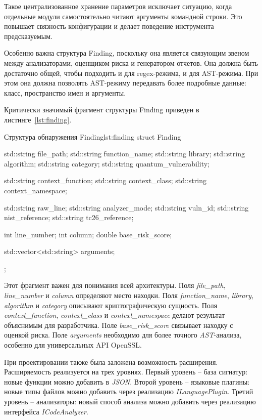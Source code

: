\documentclass{itmo-vkr}
\begin{document}
	Такое централизованное хранение параметров исключает ситуацию, когда отдельные модули самостоятельно читают аргументы командной строки. Это повышает связность конфигурации и делает поведение инструмента предсказуемым.

	
	
	
	Особенно важна структура Finding, поскольку она является связующим звеном между анализаторами, оценщиком риска и генератором отчетов. Она должна быть достаточно общей, чтобы подходить и для regex-режима, и для AST-режима. При этом она должна позволять AST-режиму передавать более подробные данные: класс, пространство имен и аргументы.
	
	Критически значимый фрагмент структуры Finding приведен в листинге~\ref{lst:finding}.

\begin{itmolisting}[C++]{Структура обнаружения Finding}{lst:finding}
struct Finding {
    std::string file_path;
    std::string function_name;
    std::string library;
    std::string algorithm;
    std::string category;
    std::string quantum_vulnerability;
    
    std::string context_function;
    std::string context_class;
    std::string context_namespace;
    
    std::string raw_line;
    std::string analyzer_mode;
    std::string vuln_id;
    std::string nist_reference;
    std::string tc26_reference;
    
    int line_number;
    int column;
    double base_risk_score;
    
    std::vector<std::string> arguments;
};
\end{itmolisting}
	
	Этот фрагмент важен для понимания всей архитектуры. Поля \textit{file\_path}, \textit{line\_number} и \textit{column} определяют место находки. Поля \textit{function\_name}, \textit{library}, \textit{algorithm} и \textit{category} описывают криптографическую сущность. Поля \textit{context\_function}, \textit{context\_class} и \textit{context\_namespace} делают результат объяснимым для разработчика. Поле \textit{base\_risk\_score} связывает находку с оценкой риска. Поле \textit{arguments} необходимо для более точного \textit{AST}-анализа, особенно для универсальных API OpenSSL.
	
	При проектировании также была заложена возможность расширения. Расширяемость реализуется на трех уровнях. Первый уровень -- база сигнатур: новые функции можно добавить в \textit{JSON}. Второй уровень -- языковые плагины: новые типы файлов можно добавить через реализацию \textit{ILanguagePlugin}. Третий уровень -- анализаторы: новый способ анализа можно добавить через реализацию интерфейса \textit{ICodeAnalyzer}.
	
\end{document}
